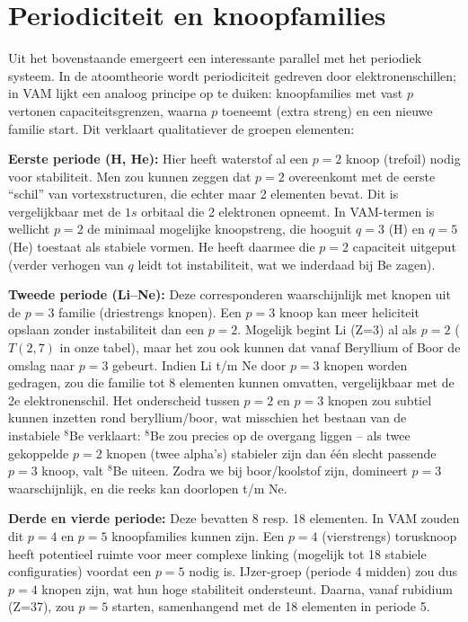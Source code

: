 
\section{Periodiciteit en knoopfamilies}

Uit het bovenstaande emergeert een interessante parallel met het periodiek systeem. In de atoomtheorie wordt periodiciteit gedreven door elektronenschillen; in VAM lijkt een analoog principe op te duiken: knoopfamilies met vast $p$ vertonen capaciteitsgrenzen, waarna $p$ toeneemt (extra streng) en een nieuwe familie start. Dit verklaart qualitatiever de groepen elementen:

\textbf{Eerste periode (H, He):} Hier heeft waterstof al een $p=2$ knoop (trefoil) nodig voor stabiliteit. Men zou kunnen zeggen dat $p=2$ overeenkomt met de eerste “schil” van vortexstructuren, die echter maar 2 elementen bevat. Dit is vergelijkbaar met de $1s$ orbitaal die 2 elektronen opneemt. In VAM-termen is wellicht $p=2$ de minimaal mogelijke knoopstreng, die hooguit $q=3$ (H) en $q=5$ (He) toestaat als stabiele vormen. He heeft daarmee die $p=2$ capaciteit uitgeput (verder verhogen van $q$ leidt tot instabiliteit, wat we inderdaad bij Be zagen).

\textbf{Tweede periode (Li–Ne):} Deze corresponderen waarschijnlijk met knopen uit de $p=3$ familie (driestrengs knopen). Een $p=3$ knoop kan meer heliciteit opslaan zonder instabiliteit dan een $p=2$. Mogelijk begint Li (Z=3) al als $p=2$ ($T(2,7)$ in onze tabel), maar het zou ook kunnen dat vanaf Beryllium of Boor de omslag naar $p=3$ gebeurt. Indien Li t/m Ne door $p=3$ knopen worden gedragen, zou die familie tot 8 elementen kunnen omvatten, vergelijkbaar met de 2e elektronenschil. Het onderscheid tussen $p=2$ en $p=3$ knopen zou subtiel kunnen inzetten rond beryllium/boor, wat misschien het bestaan van de instabiele $^8$Be verklaart: $^8$Be zou precies op de overgang liggen – als twee gekoppelde $p=2$ knopen (twee alpha’s) stabieler zijn dan één slecht passende $p=3$ knoop, valt $^8$Be uiteen. Zodra we bij boor/koolstof zijn, domineert $p=3$ waarschijnlijk, en die reeks kan doorlopen t/m Ne.

\textbf{Derde en vierde periode:} Deze bevatten 8 resp. 18 elementen. In VAM zouden dit $p=4$ en $p=5$ knoopfamilies kunnen zijn. Een $p=4$ (vierstrengs) torusknoop heeft potentieel ruimte voor meer complexe linking (mogelijk tot 18 stabiele configuraties) voordat een $p=5$ nodig is. IJzer-groep (periode 4 midden) zou dus $p=4$ knopen zijn, wat hun hoge stabiliteit ondersteunt. Daarna, vanaf rubidium (Z=37), zou $p=5$ starten, samenhangend met de 18 elementen in periode 5.

